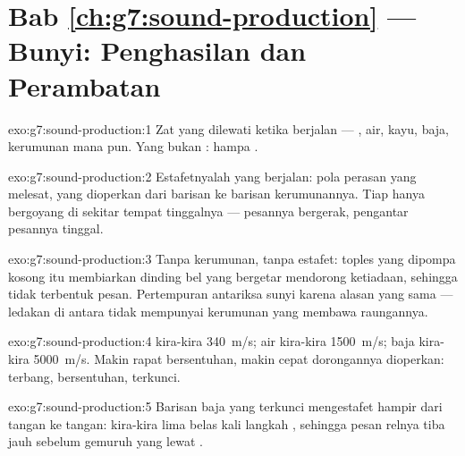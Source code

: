 \section*{Bab \ref{ch:g7:sound-production} --- Bunyi: Penghasilan dan Perambatan}

\begin{solution}{exo:g7:sound-production:1}
Zat yang dilewati  ketika berjalan --- , air, kayu, baja,
kerumunan  mana pun. Yang bukan : hampa .
\end{solution}

\begin{solution}{exo:g7:sound-production:2}
Estafetnyalah yang berjalan: pola perasan yang melesat, yang dioperkan
dari barisan ke barisan kerumunannya. Tiap  hanya bergoyang di
sekitar tempat tinggalnya --- pesannya bergerak, pengantar pesannya
tinggal.
\end{solution}

\begin{solution}{exo:g7:sound-production:3}
Tanpa kerumunan, tanpa estafet: toples yang dipompa kosong itu
membiarkan dinding bel yang bergetar mendorong ketiadaan, sehingga
tidak terbentuk pesan. Pertempuran antariksa sunyi karena alasan yang
sama --- ledakan di antara  tidak mempunyai kerumunan yang
membawa raungannya.
\end{solution}

\begin{solution}{exo:g7:sound-production:4}
 kira-kira \qty{340}{m/s}; air kira-kira \qty{1500}{m/s}; baja
kira-kira \qty{5000}{m/s}. Makin rapat  bersentuhan, makin
cepat dorongannya dioperkan: terbang, bersentuhan, terkunci.
\end{solution}

\begin{solution}{exo:g7:sound-production:5}
Barisan baja yang terkunci mengestafet hampir dari tangan ke tangan:
kira-kira lima belas kali langkah , sehingga pesan relnya tiba
jauh sebelum gemuruh yang lewat .
\end{solution}

